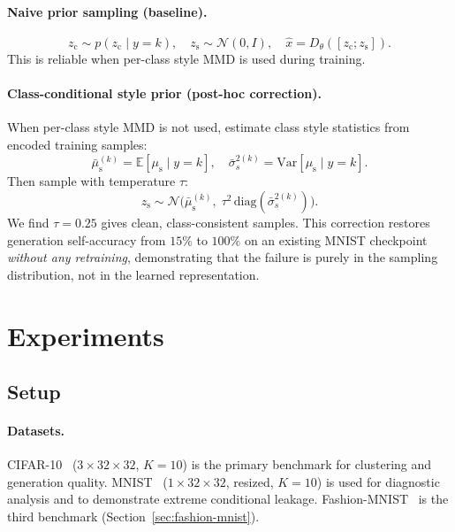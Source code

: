 \documentclass[10pt]{article}
\newcommand{\zc}{z_{\mathrm{c}}}
\newcommand{\zs}{z_{\mathrm{s}}}
\newcommand{\mus}{\mu_{\mathrm{s}}}
\newcommand{\diag}{\mathrm{diag}}
\begin{document}
\paragraph{Naive prior sampling (baseline).}
\begin{equation}
  \zc\sim p(\zc\mid y{=}k), \quad
  \zs\sim\mathcal{N}(0,I), \quad
  \hat{x}=D_\theta([\zc;\zs]).
  \label{eq:naive-gen}
\end{equation}
This is reliable when per-class style MMD is used during training.

\paragraph{Class-conditional style prior (post-hoc correction).}
When per-class style MMD is not used, estimate class style statistics from
encoded training samples:
\begin{equation}
  \bar\mus^{(k)} = \mathbb{E}[\mus\mid y{=}k],
  \quad
  \bar\sigma_s^{2(k)} = \mathrm{Var}[\mus\mid y{=}k].
  \label{eq:class-style-stats}
\end{equation}
Then sample with temperature $\tau$:
\begin{equation}
  \zs\sim\mathcal{N}\!\bigl(
    \bar\mus^{(k)},\;
    \tau^2\,\diag(\bar\sigma_s^{2(k)})
  \bigr).
  \label{eq:cond-style-prior}
\end{equation}
We find $\tau=0.25$ gives clean, class-consistent samples.
This correction restores generation self-accuracy from $15\%$ to $100\%$ on an
existing MNIST checkpoint \emph{without any retraining}, demonstrating that the
failure is purely in the sampling distribution, not in the learned representation.

\section{Experiments}
\label{sec:experiments}

\subsection{Setup}

\paragraph{Datasets.}
CIFAR-10~\citep{krizhevsky2009learning} ($3\times32\times32$, $K=10$) is the primary
benchmark for clustering and generation quality.
MNIST~\citep{lecun1998gradient} ($1\times32\times32$, resized, $K=10$) is used for
diagnostic analysis and to demonstrate extreme conditional leakage.
Fashion-MNIST~\citep{xiao2017fashion} is the third benchmark
(Section~\ref{sec:fashion-mnist}).
\end{document}
